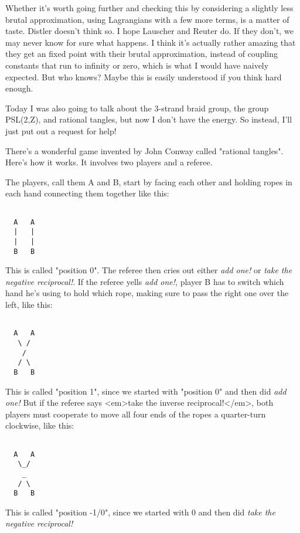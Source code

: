 Whether it's worth going further and checking this by considering 
a slightly less brutal approximation, using Lagrangians with a few 
more terms, is a matter of taste.  Distler doesn't think so.  I 
hope Lauscher and Reuter do.  If they don't, we may never know for
sure what happens.  I think it's actually rather amazing that they 
get an fixed point with their brutal approximation, instead of 
coupling constants that run to infinity or zero, which is what 
I would have naively expected.  But who knows?  Maybe this is 
easily understood if you think hard enough.


Today I was also going to talk about the 3-strand braid group, the 
group PSL(2,Z), and rational tangles, but now I don't have the energy.  
So instead, I'll just put out a request for help!  

There's a wonderful game invented by John Conway called "rational
tangles".  Here's how it works.  It involves two players and a referee.

The players, call them A and B, start by facing each other and holding 
ropes in each hand connecting them together like this:
  

\begin{verbatim}

  A   A
  |   |
  |   |
  B   B
\end{verbatim}
    

This is called "position 0".  
The referee then cries out either \emph{add one!} 
or \emph{take the negative reciprocal!}.   
If the referee yells \emph{add one!}, player
B has to switch which hand he's using to hold which rope, making sure to
pass the right one over the left, like this:


\begin{verbatim}

  A   A
   \ /
    /
   / \
  B   B
\end{verbatim}
    

This is called "position 1", 
since we started with "position 0" and
then did \emph{add one!}  But if the referee says <em>take the inverse 
reciprocal!</em>, both players must cooperate to move all four ends of
the ropes a quarter-turn clockwise, like this:


\begin{verbatim}

  A   A
   \_/
    _
   / \
  B   B
\end{verbatim}
    

This is called "position -1/0", since we started with 0 and then
did \emph{take the negative reciprocal!}

